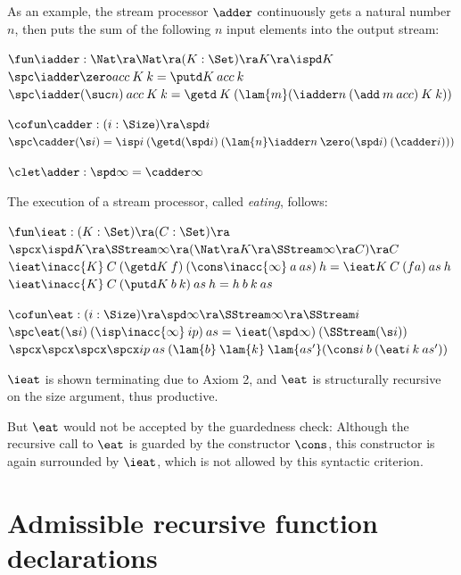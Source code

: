 As an example, the stream processor $\adder$ continuously gets a natural number $n$, 
then puts the sum of the following $n$ input elements into the output stream:
\begin{bsp}
$\fun \iadder : \Nat \ra \Nat \ra (K : \Set ) \ra K \ra \ispd K$\\
$\spc \iadder \zero acc \: K \: k = \putd K \: acc \: k$\\
$\spc \iadder (\suc n) \: acc \: K \: k = \getd \: K \: (\lam{m} (\iadder n \: (\add \: m \: acc) \: K \: k))$

$\cofun \cadder : (i : \Size ) \ra \spd i$\\
$\spc \cadder (\s i) = \isp i \: (\getd (\spd i) \: (\lam{n} \iadder n \: \zero (\spd i) \: (\cadder i)))$

$\clet \adder : \spd \infty = \cadder \infty$
\end{bsp}
\noindent The execution of a stream processor, called \emph{eating}, follows:
\begin{bsp}
$\fun \ieat : (K : \Set) \ra (C : \Set) \ra $\\
$ \spcx \ispd K \ra \SStream \infty \ra (\Nat \ra K \ra \SStream \infty \ra C) \ra C$ \\
$ \ieat \inacc{K} \: C \: (\getd K \: f) \: (\cons \inacc{\infty} \: a \: as) \: h = \ieat K \: C \: (f a) \: as \: h $ \\
$ \ieat \inacc{K} \: C \: (\putd K \: b \:k) \: as  \: h = h \: b \: k \: as $

$\cofun \eat : (i : \Size) \ra \spd \infty \ra \SStream \infty \ra \SStream i$\\
$\spc \eat (\s i) \: (\isp \inacc{\infty} \: ip) \: as = \ieat (\spd \infty) \: (\SStream (\s i))$\\
$\spcx \spcx \spcx  \spcx ip \: as \: (\lam{b} \: \lam{k} \: \lam{as'} (\cons i \: b \: (\eat i \: k \: as'))$   
\end{bsp}
\noindent $\ieat$ is shown terminating due to Axiom 2, and $\eat$ is structurally recursive on the size argument, thus productive.

But $\eat$ would not be accepted by the guardedness check: Although the recursive call to $\eat$ is guarded by the constructor $\cons$, this constructor is again surrounded by $\ieat$, which is not allowed by this syntactic criterion.

\section{Admissible recursive function declarations}



